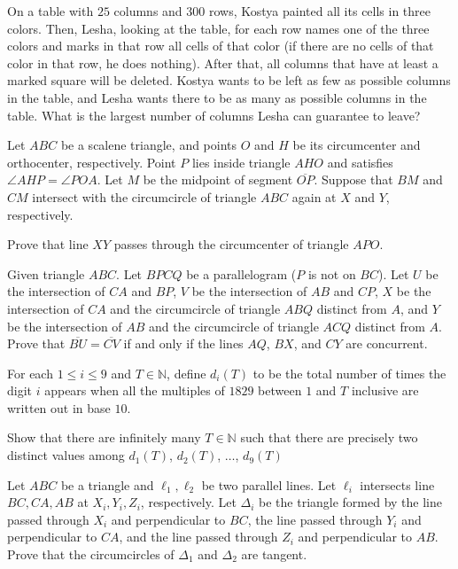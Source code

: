 \documentclass[11pt]{scrartcl}
\begin{document}
\begin{problem}[482459214391384]
	On a table with $25$ columns and $300$ rows, Kostya painted all its cells in three colors. Then, Lesha, looking at the table, for each row names one of the three colors and marks in that row all cells of that color (if there are no cells of that color in that row, he does nothing). After that, all columns that have at least a marked square will be deleted.
Kostya wants to be left as few as possible columns in the table, and Lesha wants there to be as many as possible columns in the table. What is the largest number of columns Lesha can guarantee to leave?
\end{problem}
\begin{problem}[8053761138620448460]
	Let $ABC$ be a scalene triangle, and points $O$ and $H$ be its circumcenter and orthocenter, respectively. Point $P$ lies inside triangle $AHO$ and satisfies $\angle AHP = \angle POA$. Let $M$ be the midpoint of segment $\overline{OP}$. Suppose that $BM$ and $CM$ intersect with the circumcircle of triangle $ABC$ again at $X$ and $Y$, respectively.

Prove that line $XY$ passes through the circumcenter of triangle $APO$.
\end{problem}
\begin{problem}[302438226120877]
	Given triangle $ABC$. Let $BPCQ$ be a parallelogram ($P$ is not on $BC$). Let $U$ be the intersection of $CA$ and $BP$, $V$ be the intersection of $AB$ and $CP$, $X$ be the intersection of $CA$ and the circumcircle of triangle $ABQ$ distinct from $A$, and $Y$ be the intersection of $AB$ and the circumcircle of triangle $ACQ$ distinct from $A$.
Prove that $\overline{BU} = \overline{CV}$ if and only if the lines $AQ$, $BX$, and $CY$ are concurrent.
\end{problem}
\begin{problem}[526922799283626]
	For each $1\leq i\leq 9$ and $T\in\mathbb N$, define $d_i(T)$ to be the total number of times the digit $i$ appears when all the multiples of $1829$ between $1$ and $T$ inclusive are written out in base $10$.

Show that there are infinitely many $T\in\mathbb N$ such that there are precisely two distinct values among $d_1(T)$, $d_2(T)$, $\dots$, $d_9(T)$
\end{problem}
\begin{problem}[4992489807901310938]
Let $ABC$ be a triangle and $\ell_1,\ell_2$ be two parallel lines. Let $\ell_i$ intersects line $BC,CA,AB$ at $X_i,Y_i,Z_i$, respectively. Let $\Delta_i$ be the triangle formed by the line passed through $X_i$ and perpendicular to $BC$, the line passed through $Y_i$ and perpendicular to $CA$, and the line passed through $Z_i$ and perpendicular to $AB$. Prove that the circumcircles of $\Delta_1$ and $\Delta_2$ are tangent.
\end{problem}
\end{document}
